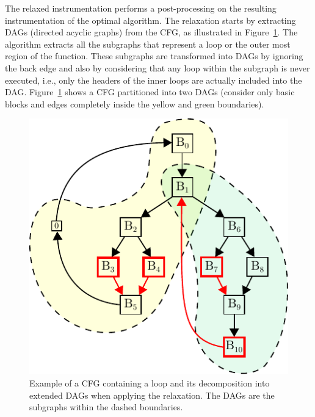 The relaxed instrumentation performs a post-processing on the resulting instrumentation of the optimal algorithm.
The relaxation starts by extracting DAGs (directed acyclic graphs) from the CFG, as illustrated in Figure~\ref{fig:cfg-relax-example}.
The algorithm extracts all the subgraphs that represent a loop or the outer most region of the function.
These subgraphs are transformed into DAGs by ignoring the back edge and also by considering that any loop within the subgraph is never executed, i.e., only the headers of the inner loops are actually included into the DAG.
Figure~\ref{fig:cfg-relax-example} shows a CFG partitioned into two DAGs (consider only basic blocks and edges completely inside the yellow and green boundaries).
%
%

\begin{figure}[h]
  \centering
  \includegraphics[scale=1]{figs/cfg-relax-example.pdf}
  \caption{Example of a CFG containing a loop and its decomposition into extended DAGs when applying the relaxation.
           The DAGs are the subgraphs within the dashed boundaries.}
  \label{fig:cfg-relax-example}
\end{figure}

